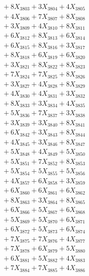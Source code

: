 \documentclass[a4paper,10pt]{article}
\begin{document}
{\begin{align}
&\;  + 8 X_{3803} + 3 X_{3804} + 4 X_{3805} \\[0.3ex]
&\;  + 4 X_{3806} + 7 X_{3807} + 8 X_{3808} \\[0.3ex]
&\;  + 3 X_{3809} + 4 X_{3810} + 8 X_{3811} \\[0.3ex]
&\;  + 6 X_{3812} + 8 X_{3813} + 6 X_{3814} \\[0.3ex]
&\;  + 6 X_{3815} + 8 X_{3816} + 3 X_{3817} \\[0.3ex]
&\;  + 8 X_{3818} + 6 X_{3819} + 6 X_{3820} \\[0.5ex]\allowbreak
&\;  + 3 X_{3821} + 8 X_{3822} + 8 X_{3823} \\[0.3ex]
&\;  + 7 X_{3824} + 7 X_{3825} + 8 X_{3826} \\[0.3ex]
&\;  + 3 X_{3827} + 4 X_{3828} + 8 X_{3829} \\[0.3ex]
&\;  + 4 X_{3830} + 4 X_{3831} + 3 X_{3832} \\[0.3ex]
&\;  + 8 X_{3833} + 3 X_{3834} + 4 X_{3835} \\[0.3ex]
&\;  + 5 X_{3836} + 7 X_{3837} + 3 X_{3838} \\[0.3ex]
&\;  + 3 X_{3839} + 3 X_{3840} + 8 X_{3841} \\[0.3ex]
&\;  + 6 X_{3842} + 3 X_{3843} + 8 X_{3844} \\[0.3ex]
&\;  + 4 X_{3845} + 3 X_{3846} + 8 X_{3847} \\[0.3ex]
&\;  + 5 X_{3848} + 4 X_{3849} + 5 X_{3850} \\[0.5ex]\allowbreak
&\;  + 5 X_{3851} + 7 X_{3852} + 8 X_{3853} \\[0.3ex]
&\;  + 5 X_{3854} + 5 X_{3855} + 5 X_{3856} \\[0.3ex]
&\;  + 4 X_{3857} + 6 X_{3858} + 3 X_{3859} \\[0.3ex]
&\;  + 6 X_{3860} + 6 X_{3861} + 6 X_{3862} \\[0.3ex]
&\;  + 8 X_{3863} + 3 X_{3864} + 8 X_{3865} \\[0.3ex]
&\;  + 6 X_{3866} + 5 X_{3867} + 6 X_{3868} \\[0.3ex]
&\;  + 5 X_{3869} + 5 X_{3870} + 6 X_{3871} \\[0.3ex]
&\;  + 6 X_{3872} + 5 X_{3873} + 6 X_{3874} \\[0.3ex]
&\;  + 7 X_{3875} + 7 X_{3876} + 4 X_{3877} \\[0.3ex]
&\;  + 7 X_{3878} + 6 X_{3879} + 5 X_{3880} \\[0.5ex]\allowbreak
&\;  + 6 X_{3881} + 5 X_{3882} + 4 X_{3883} \\[0.3ex]
&\;  + 7 X_{3884} + 7 X_{3885} + 4 X_{3886} \\[0.3ex]

\end{align}}
\end{document}
